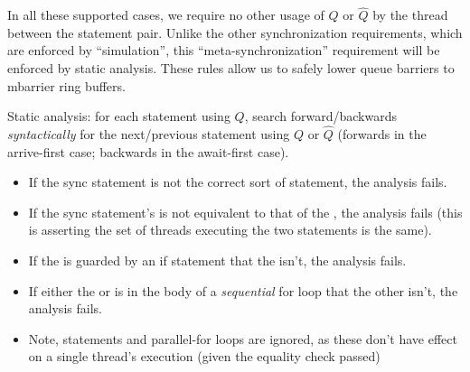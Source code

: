 \filbreak
In all these supported cases, we require no other usage of $Q$ or $\widehat{Q}$ by the thread between the statement pair.
Unlike the other synchronization requirements, which are enforced by ``simulation'', this ``meta-synchronization'' requirement will be enforced by static analysis.
These rules allow us to safely lower queue barriers to mbarrier ring buffers.

Static analysis: for each  statement using $Q$, search forward/backwards \textit{syntactically} for the next/previous statement using $Q$ or $\widehat{Q}$ (forwards in the arrive-first case; backwards in the await-first case).
\filbreak
\begin{itemize}
  \item If the sync statement is not the correct sort of  statement, the analysis fails.
  \filbreak
  \item If the sync statement's  is not equivalent to that of the , the analysis fails (this is asserting the set of threads executing the two statements is the same).
  \filbreak
  \item If the  is guarded by an if statement that the  isn't, the analysis fails.
  \filbreak
  \item If either the  or  is in the body of a \textit{sequential} for loop that the other isn't, the analysis fails.
  \filbreak
  \item Note,  statements and parallel-for loops are ignored, as these don't have effect on a single thread's execution (given the  equality check passed)
\end{itemize}

\filbreak
{}

\filbreak
{}




